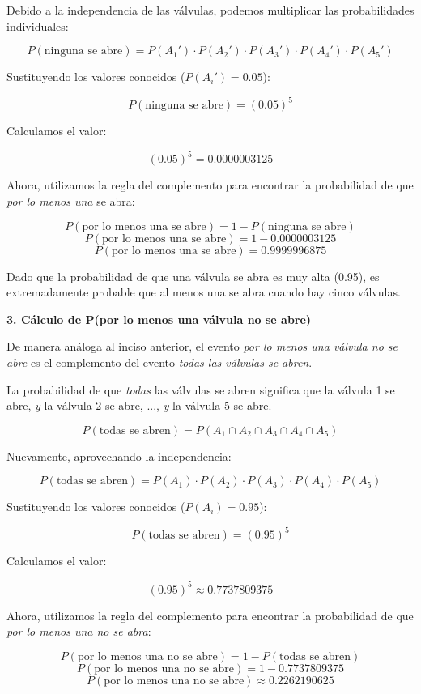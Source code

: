 \documentclass[a4paper]{article}
\begin{document}
Debido a la independencia de las válvulas, podemos multiplicar las probabilidades individuales:

$$ P(\text{ninguna se abre}) = P(A_1') \cdot P(A_2') \cdot P(A_3') \cdot P(A_4') \cdot P(A_5') $$

Sustituyendo los valores conocidos ($P(A_i') = 0.05$):

$$ P(\text{ninguna se abre}) = (0.05)^5 $$

Calculamos el valor:

$$ (0.05)^5 = 0.0000003125 $$

Ahora, utilizamos la regla del complemento para encontrar la probabilidad de que \textit{por lo menos una} se abra:

$$ P(\text{por lo menos una se abre}) = 1 - P(\text{ninguna se abre}) $$
$$ P(\text{por lo menos una se abre}) = 1 - 0.0000003125 $$
$$ P(\text{por lo menos una se abre}) = 0.9999996875 $$

Dado que la probabilidad de que una válvula se abra es muy alta (0.95), es extremadamente probable que al menos una se abra cuando hay cinco válvulas.

\textbf{3. Cálculo de P(por lo menos una válvula no se abre)}

De manera análoga al inciso anterior, el evento \textit{por lo menos una válvula no se abre} es el complemento del evento \textit{todas las válvulas se abren}.

La probabilidad de que \textit{todas} las válvulas se abren significa que la válvula 1 se abre, \textit{y} la válvula 2 se abre, ..., \textit{y} la válvula 5 se abre.

$$ P(\text{todas se abren}) = P(A_1 \cap A_2 \cap A_3 \cap A_4 \cap A_5) $$

Nuevamente, aprovechando la independencia:

$$ P(\text{todas se abren}) = P(A_1) \cdot P(A_2) \cdot P(A_3) \cdot P(A_4) \cdot P(A_5) $$

Sustituyendo los valores conocidos ($P(A_i) = 0.95$):

$$ P(\text{todas se abren}) = (0.95)^5 $$

Calculamos el valor:

$$ (0.95)^5 \approx 0.7737809375 $$

Ahora, utilizamos la regla del complemento para encontrar la probabilidad de que \textit{por lo menos una no se abra}:

$$ P(\text{por lo menos una no se abre}) = 1 - P(\text{todas se abren}) $$
$$ P(\text{por lo menos una no se abre}) = 1 - 0.7737809375 $$
$$ P(\text{por lo menos una no se abre}) \approx 0.2262190625 $$
\end{document}

